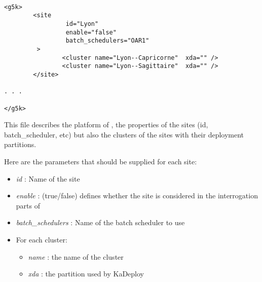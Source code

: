 \begin{verbatim}

<g5k>
        <site
                 id="Lyon"
                 enable="false"
                 batch_schedulers="OAR1"
         >
                <cluster name="Lyon--Capricorne"  xda="" />
                <cluster name="Lyon--Sagittaire"  xda="" />
        </site>

. . .

</g5k>

\end{verbatim}

This file describes the platform of \gfk, the properties of the sites
(id, batch\_scheduler, etc) but also the clusters of the sites with their
deployment partitions.

Here are the parameters that should be supplied for each site:

\begin{itemize}
  \item \textit{id} : Name of the site
  \item \textit{enable} : (true/false) defines whether the site is considered in
  the interrogation parts of \grudu
  \item \textit{batch\_schedulers} : Name of the batch scheduler to use
  \item For each cluster:
  \begin{itemize}
    \item \textit{name} : the name of the cluster
    \item \textit{xda} : the partition used by KaDeploy
    \end{itemize}
\end{itemize}

